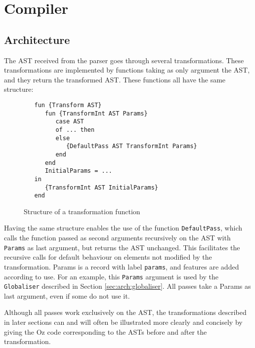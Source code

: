 \documentclass[a4paper]{memoir}
\begin{document}
\chapter{Compiler}
\section{Architecture}
The AST received from the parser goes through several transformations. These transformations are implemented by functions taking as only argument the AST, and they return the transformed AST.
These functions all have the same structure:
\begin{figure}[h]
\begin{lstlisting}
   fun {Transform AST}
      fun {TransformInt AST Params}
         case AST
         of ... then
         else
            {DefaultPass AST TransformInt Params}
         end
      end
      InitialParams = ...
   in
      {TransformInt AST InitialParams}
   end
\end{lstlisting}
\caption{Structure of a transformation function}
\end{figure}
Having the same structure enables the use of the function \lstinline!DefaultPass!, which calls the function passed as second arguments recursively on the AST with \lstinline!Params! as last argument, but returns the AST unchanged. This facilitates the recursive calls for default behaviour on elements not modified by the transformation.
Params is a record with label \lstinline!params!, and features are added
according to use. For an example, this \lstinline!Params! argument is used by
the \lstinline!Globaliser! described in Section \ref{sec:arch:globaliser}. All
passes take a Params as last argument, even if some do not use it. 


Although all passes work exclusively on the AST, the transformations described in later sections can and will often be illustrated more clearly and concisely by giving the Oz code corresponding to the ASTs before and after the transformation. 
\end{document}

